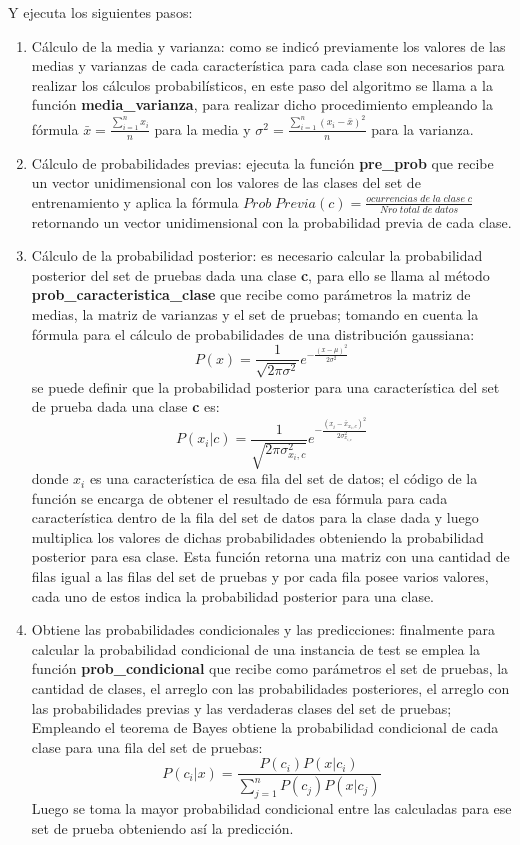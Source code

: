 Y ejecuta los siguientes pasos:
\begin{enumerate}
	\item Cálculo de la media y varianza:
	como se indicó previamente los valores de las medias y varianzas de cada característica para cada clase son necesarios
	para realizar los cálculos probabilísticos, en este paso del algoritmo se llama a la función \textbf{media\_varianza}, para
	realizar dicho procedimiento empleando la fórmula $\bar{x}=\frac{\sum_{i=1}^n{x_{i}}}{n}$ para la media y
	$\sigma^2=\frac{\sum_{i=1}^n{\left(x_{i}-\bar{x}\right)^2}}{n}$ para la varianza.\\
	\item Cálculo de probabilidades previas:
	ejecuta la función \textbf{pre\_prob} que recibe un vector unidimensional con los valores de las clases
	del set de entrenamiento y aplica la fórmula
	$Prob\;Previa\left(c\right)=\frac{ocurrencias\;de\;la\;clase\;c}{Nro\;total\;de\;datos}$
	retornando un vector unidimensional con la probabilidad previa de cada clase.\\
	\item Cálculo de la probabilidad posterior:
	es necesario calcular la probabilidad posterior del set de pruebas dada una clase \textbf{c},
	para ello se llama al método \textbf{prob\_caracteristica\_clase} que recibe como
	parámetros la matriz de medias, la matriz de varianzas y el set de pruebas; tomando en cuenta la
	fórmula para el cálculo de probabilidades de una distribución gaussiana:
	\[
	P\left(x\right) = \frac{1}{\sqrt{2\pi\sigma^{2}}}e^{-\frac{\left(x-\mu\right)^{2}}{2\sigma^{2}}}
	\]
	se puede definir que la probabilidad posterior para una característica del set de prueba dada una
	clase \textbf{c} es:
	\[
	P\left(x_{i}|c\right) = \frac{1}{\sqrt{2\pi\sigma^{2}_{x_{i},c}}}
	e^{-\frac{\left(x_{i}-\bar{x}_{x_{i},c}\right)^{2}}{2\sigma^{2}_{x_{i,c}}}}
	\]
	donde $x_{i}$ es una característica de esa fila del set de datos; el código de la función se encarga de
	obtener el resultado de esa fórmula para cada característica dentro de la fila del set de datos para
	la clase dada y luego multiplica los valores de dichas probabilidades obteniendo la probabilidad posterior
	para esa clase. Esta función retorna una matriz con una cantidad de filas igual a las filas del set de
	pruebas y por cada fila posee varios valores, cada uno de estos indica la probabilidad posterior para una clase.\\

	\item Obtiene las probabilidades condicionales y las predicciones:
	finalmente para calcular la probabilidad condicional de una instancia de test se emplea la función
	\textbf{prob\_condicional} que recibe como parámetros el set de pruebas, la cantidad de clases, el
	arreglo con las probabilidades posteriores, el arreglo con las probabilidades previas y las verdaderas
	clases del set de pruebas; Empleando el teorema de Bayes obtiene la probabilidad condicional de cada
	clase para una fila del set de pruebas:
	\[P\left(c_{i}|x\right)=
	\frac{P\left(c_{i}\right)P\left(x|c_{i}\right)}{\sum_{j=1}^{n}P\left(c_{j}\right)P\left(x|c_{j}\right)}
	\]
	Luego se toma la mayor probabilidad condicional entre las calculadas para ese set de prueba
	obteniendo así la predicción.



\end{enumerate}
